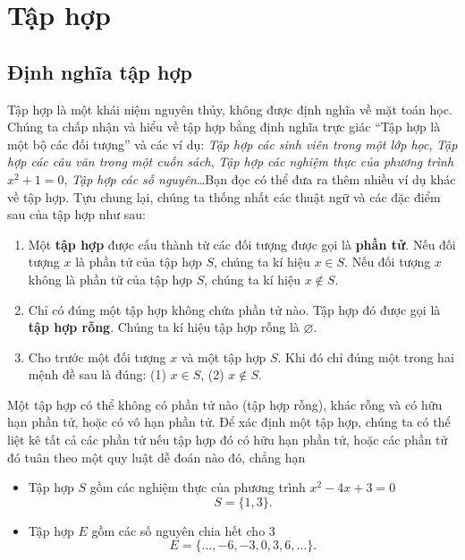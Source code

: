 \section{Tập hợp}

\subsection*{Định nghĩa tập hợp}

Tập hợp là một khái niệm nguyên thủy, không được định nghĩa về mặt toán học. Chúng ta chấp nhận và hiểu về tập hợp bằng định nghĩa trực giác ``Tập hợp là một bộ các đối tượng'' và các ví dụ: \textit{Tập hợp các sinh viên trong một lớp học}, \textit{Tập hợp các câu văn trong một cuốn sách}, \textit{Tập hợp các nghiệm thực của phương trình $x^{2} + 1 = 0$}, \textit{Tập hợp các số nguyên}\ldots Bạn đọc có thể đưa ra thêm nhiều ví dụ khác về tập hợp. Tựu chung lại, chúng ta thống nhất các thuật ngữ và các đặc điểm sau của tập hợp như sau:
\begin{enumerate}[label={(\arabic*)},itemsep=0pt]
    \item Một \textbf{tập hợp} được cấu thành từ các đối tượng được gọi là \textbf{phần tử}. Nếu đối tượng $x$ là phần tử của tập hợp $S$, chúng ta kí hiệu $x\in S$. Nếu đối tượng $x$ không là phần tử của tập hợp $S$, chúng ta kí hiệu $x\notin S$.
    \item Chỉ có đúng một tập hợp không chứa phần tử nào. Tập hợp đó được gọi là \textbf{tập hợp rỗng}. Chúng ta kí hiệu tập hợp rỗng là $\varnothing$.
    \item Cho trước một đối tượng $x$ và một tập hợp $S$. Khi đó chỉ đúng một trong hai mệnh đề sau là đúng: (1) $x\in S$, (2) $x\notin S$.
\end{enumerate}

Một tập hợp có thể không có phần tử nào (tập hợp rỗng), khác rỗng và có hữu hạn phần tử, hoặc có vô hạn phần tử. Để xác định một tập hợp, chúng ta có thể liệt kê tất cả các phần tử nếu tập hợp đó có hữu hạn phần tử, hoặc các phần tử đó tuân theo một quy luật dễ đoán nào đó, chẳng hạn
\begin{itemize}
    \item Tập hợp $S$ gồm các nghiệm thực của phương trình $x^{2} - 4x + 3 = 0$
          \[
              S = \{ 1, 3 \}.
          \]
    \item Tập hợp $E$ gồm các số nguyên chia hết cho $3$
          \[
              E = \{ \ldots, -6, -3, 0, 3, 6, \ldots \}.
          \]
\end{itemize}

